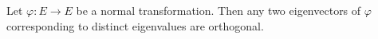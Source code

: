 Let $\varphi: E \rightarrow E$ be a normal transformation. Then any two eigenvectors of $\varphi$ corresponding to distinct eigenvalues are orthogonal.
